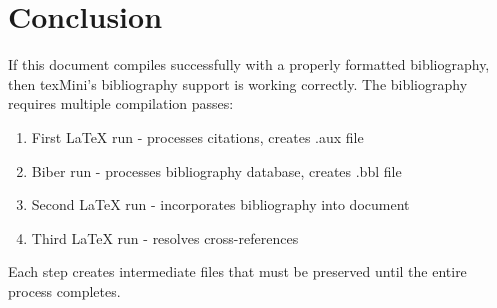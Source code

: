 \documentclass[11pt]{article}
\begin{document}
\section{Conclusion}

If this document compiles successfully with a properly formatted bibliography, then texMini's bibliography support is working correctly. The bibliography requires multiple compilation passes:

\begin{enumerate}
    \item First LaTeX run - processes citations, creates .aux file
    \item Biber run - processes bibliography database, creates .bbl file  
    \item Second LaTeX run - incorporates bibliography into document
    \item Third LaTeX run - resolves cross-references
\end{enumerate}

Each step creates intermediate files that must be preserved until the entire process completes.

\printbibliography
\end{document}
